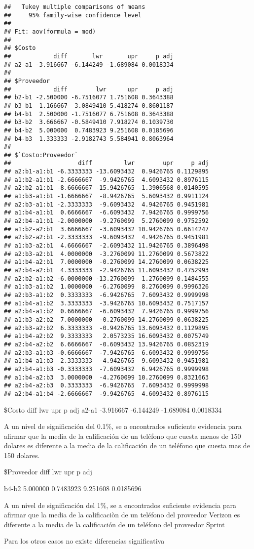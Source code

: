 \documentclass[]{article}
\begin{document}
\begin{verbatim}
##   Tukey multiple comparisons of means
##     95% family-wise confidence level
## 
## Fit: aov(formula = mod)
## 
## $Costo
##            diff       lwr       upr     p adj
## a2-a1 -3.916667 -6.144249 -1.689084 0.0018334
## 
## $Proveedor
##            diff        lwr      upr     p adj
## b2-b1 -2.500000 -6.7516077 1.751608 0.3643388
## b3-b1  1.166667 -3.0849410 5.418274 0.8601187
## b4-b1  2.500000 -1.7516077 6.751608 0.3643388
## b3-b2  3.666667 -0.5849410 7.918274 0.1039730
## b4-b2  5.000000  0.7483923 9.251608 0.0185696
## b4-b3  1.333333 -2.9182743 5.584941 0.8063964
## 
## $`Costo:Proveedor`
##                   diff         lwr        upr     p adj
## a2:b1-a1:b1 -6.3333333 -13.6093432  0.9426765 0.1129895
## a1:b2-a1:b1 -2.6666667  -9.9426765  4.6093432 0.8976115
## a2:b2-a1:b1 -8.6666667 -15.9426765 -1.3906568 0.0140595
## a1:b3-a1:b1 -1.6666667  -8.9426765  5.6093432 0.9911124
## a2:b3-a1:b1 -2.3333333  -9.6093432  4.9426765 0.9451981
## a1:b4-a1:b1  0.6666667  -6.6093432  7.9426765 0.9999756
## a2:b4-a1:b1 -2.0000000  -9.2760099  5.2760099 0.9752592
## a1:b2-a2:b1  3.6666667  -3.6093432 10.9426765 0.6614247
## a2:b2-a2:b1 -2.3333333  -9.6093432  4.9426765 0.9451981
## a1:b3-a2:b1  4.6666667  -2.6093432 11.9426765 0.3896498
## a2:b3-a2:b1  4.0000000  -3.2760099 11.2760099 0.5673822
## a1:b4-a2:b1  7.0000000  -0.2760099 14.2760099 0.0638225
## a2:b4-a2:b1  4.3333333  -2.9426765 11.6093432 0.4752993
## a2:b2-a1:b2 -6.0000000 -13.2760099  1.2760099 0.1484555
## a1:b3-a1:b2  1.0000000  -6.2760099  8.2760099 0.9996326
## a2:b3-a1:b2  0.3333333  -6.9426765  7.6093432 0.9999998
## a1:b4-a1:b2  3.3333333  -3.9426765 10.6093432 0.7517157
## a2:b4-a1:b2  0.6666667  -6.6093432  7.9426765 0.9999756
## a1:b3-a2:b2  7.0000000  -0.2760099 14.2760099 0.0638225
## a2:b3-a2:b2  6.3333333  -0.9426765 13.6093432 0.1129895
## a1:b4-a2:b2  9.3333333   2.0573235 16.6093432 0.0075749
## a2:b4-a2:b2  6.6666667  -0.6093432 13.9426765 0.0852319
## a2:b3-a1:b3 -0.6666667  -7.9426765  6.6093432 0.9999756
## a1:b4-a1:b3  2.3333333  -4.9426765  9.6093432 0.9451981
## a2:b4-a1:b3 -0.3333333  -7.6093432  6.9426765 0.9999998
## a1:b4-a2:b3  3.0000000  -4.2760099 10.2760099 0.8321663
## a2:b4-a2:b3  0.3333333  -6.9426765  7.6093432 0.9999998
## a2:b4-a1:b4 -2.6666667  -9.9426765  4.6093432 0.8976115
\end{verbatim}

\$Costo diff lwr upr p adj a2-a1 -3.916667 -6.144249 -1.689084 0.0018334

A un nivel de significación del 0.1\%, se a encontrados suficiente
evidencia para afirmar que la media de la calificación de un teléfono
que cuesta menos de 150 dolares es diferente a la media de la
calificación de un teléfono que cuesta mas de 150 dolares.

\$Proveedor diff lwr upr p adj

b4-b2 5.000000 0.7483923 9.251608 0.0185696

A un nivel de significación del 1\%, se a encontrados suficiente
evidencia para afirmar que la media de la calificaciòn de un teléfono
del proveedor Verizon es diferente a la media de la calificación de un
teléfono del proveedor Sprint

Para los otros casos no existe diferencias significativa
\end{document}

